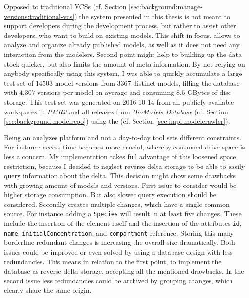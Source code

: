
Opposed to traditional VCSs (cf. Section \ref{sec:background:manage-versions:traditional-vcs}) the system presented in this thesis is not meant to support developers during the development process, but rather to assist other developers, who want to build on existing models.
This shift in focus, allows to analyze and organize already published models, as well as it does not need any interaction from the modelers. Second point might help to building up the data stock quicker, but also limits the amount of meta information.
By not relying on anybody specifically using this system, I was able to quickly accumulate a large test set of $14503$ model versions from $3367$ distinct models, filling the database with $4.307$ versions per model on average and consuming $8.5$ GBytes of disc storage.
This test set was generated on 2016-10-14 from all publicly available workspaces in \emph{PMR2} and all releases from \emph{BioModels Database} (cf. Section \ref{sec:background:modelrepo}) using the \modelcrawler (cf. Section \ref{sec:impl:modelcrawler}).

Being an analyzes platform and not a day-to-day tool sets different constraints. For instance access time becomes more crucial, whereby consumed drive space is less a concern.
My implementation takes full advantage of this loosened space restriction, because I decided to neglect reverse delta storage to be able to easily query information about the delta. This decision might show some drawbacks with growing amount of models and versions.
First issue to consider would be higher storage consumption. But also slower query execution should be considered.
Secondly \bives creates multiple changes, which have a single common source. For instance adding a \texttt{Species} will result in at least five changes. These include the insertion of the element itself and the insertion of the attributes \texttt{id}, \texttt{name}, \texttt{initialConcentration}, and \texttt{compartment} reference.
Storing this many borderline redundant changes is increasing the overall size dramatically.
Both issues could be improved or even solved by using a database design with less redundancies. This means in relation to the first point, to implement the database as reverse-delta storage, accepting all the mentioned drawbacks.
In the second issue less redundancies could be archived by grouping changes, which clearly share the same origin.

